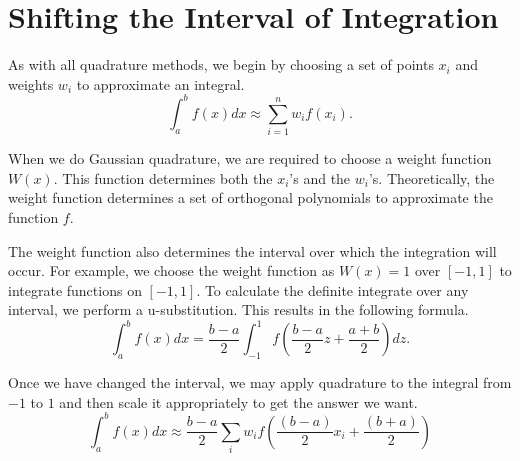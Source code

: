\label{Lab:GaussQuad}



\section*{Shifting the Interval of Integration} %

As with all quadrature methods, we begin by choosing a set of points $x_i$ and weights $w_i$ to approximate an integral.
\[
\int_{a}^b f(x) dx \approx \sum_{i=1}^n w_if(x_i).
\]

When we do Gaussian quadrature, we are required to choose a weight function $W(x)$.
This function determines both the $x_i$'s and the $w_i$'s.
Theoretically, the weight function determines a set of orthogonal polynomials to approximate the function $f$.

The weight function also determines the interval over which the integration will occur.
For example, we choose the weight function as $W(x) = 1$ over $[-1,1]$ to integrate functions on $[-1,1]$.
To calculate the definite integrate over any interval, we perform a u-substitution.
This results in the following formula.
\[
\int_a^b f(x) dx = \frac{b-a}{2}\int_{-1}^1 f(\frac{b-a}{2}z + \frac{a+b}{2})dz.
\]

Once we have changed the interval, we may apply quadrature to the integral from $-1$ to $1$ and then scale it appropriately to get the answer we want.
\[
\int_a^b f(x) dx \approx \frac{b - a}{2} \sum_i w_if(\frac{(b-a)}{2}x_i + \frac{(b+a)}{2})
\]

